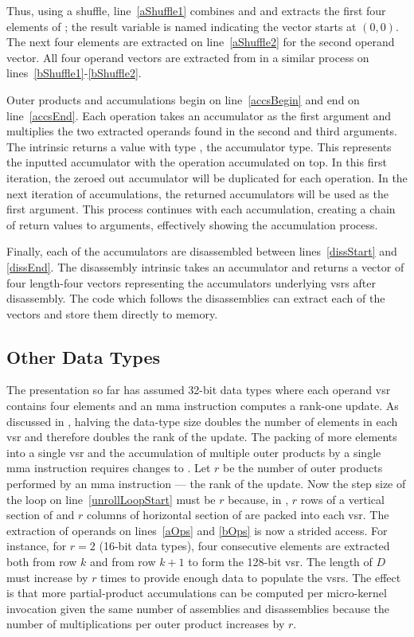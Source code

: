 \documentclass[\main/thesis.tex]{subfiles}
\begin{document}
Thus, using a shuffle, line~\ref{aShuffle1} combines  and  and extracts the first four elements of ; the result variable is named  indicating the vector starts at $(0, 0)$.
The next four elements are extracted on line~\ref{aShuffle2} for the second operand vector.
All four operand vectors are extracted from  in a similar process on lines~\ref{bShuffle1}-\ref{bShuffle2}.

Outer products and accumulations begin on line~\ref{accsBegin} and end on line~\ref{accsEnd}.
Each operation takes an accumulator as the first argument and multiplies the two extracted operands found in the second and third arguments.
The  \gls{intrinsic} returns a value with type , the accumulator type.
This represents the inputted accumulator with the operation accumulated on top.
In this first iteration, the zeroed out accumulator will be duplicated for each operation.
In the next iteration of accumulations, the returned accumulators will be used as the first argument.
This process continues with each accumulation, creating a chain of return values to arguments, effectively showing the accumulation process.

Finally, each of the accumulators are disassembled between lines~\ref{dissStart} and \ref{dissEnd}.
The disassembly \gls{intrinsic} takes an accumulator and returns a vector of four length-four  vectors representing the accumulators underlying \glspl{vsr} after disassembly.
The code which follows the disassemblies can extract each of the vectors and store them directly to memory.

\subsection{Other Data Types}
\label{sec:dataTypes}
The presentation so far has assumed 32-bit data types where each operand \gls{vsr} contains four elements and an \gls{mma} instruction computes a rank-one update.
As discussed in , halving the data-type size doubles the number of elements in each \gls{vsr} and therefore doubles the rank of the update.
The packing of more elements into a single \gls{vsr} and the accumulation of multiple outer products by a single \gls{mma} instruction requires changes to .
Let $r$ be the number of outer products performed by an \gls{mma} instruction --- \ie the rank of the update.
Now the step size of the loop on line~\ref{unrollLoopStart} must be $r$ because, in , $r$ rows of a vertical section of  and $r$ columns of horizontal section of  are packed into each \gls{vsr}.
The extraction of operands on lines~\ref{aOps} and \ref{bOps} is now a strided access.
For instance, for $r=2$ (16-bit data types), four consecutive elements are extracted both from row $k$ and from row $k+1$ to form the 128-bit \gls{vsr}.
The length of $D$ must increase by $r$ times to provide enough data to populate the \glspl{vsr}.
The effect is that more partial-product accumulations can be computed per micro-kernel invocation given the same number of assemblies and disassemblies because the number of multiplications per outer product increases by $r$.
\end{document}
